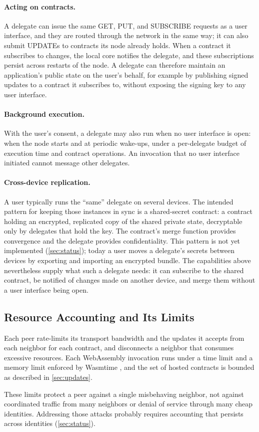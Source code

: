 \paragraph{Acting on contracts.} A delegate can issue the same \textsf{GET}, \textsf{PUT}, and \textsf{SUBSCRIBE} requests as a user interface, and they are routed through the network in the same way; it can also submit \textsf{UPDATE}s to contracts its node already holds. When a contract it subscribes to changes, the local core notifies the delegate, and these subscriptions persist across restarts of the node. A delegate can therefore maintain an application's public state on the user's behalf, for example by publishing signed updates to a contract it subscribes to, without exposing the signing key to any user interface.

\paragraph{Background execution.} With the user's consent, a delegate may also run when no user interface is open: when the node starts and at periodic wake-ups, under a per-delegate budget of execution time and contract operations. An invocation that no user interface initiated cannot message other delegates.

\paragraph{Cross-device replication.} A user typically runs the ``same'' delegate on several devices. The intended pattern for keeping those instances in sync is a shared-secret contract: a contract holding an encrypted, replicated copy of the shared private state, decryptable only by delegates that hold the key. The contract's merge function provides convergence and the delegate provides confidentiality. This pattern is not yet implemented (\cref{sec:status}); today a user moves a delegate's secrets between devices by exporting and importing an encrypted bundle. The capabilities above nevertheless supply what such a delegate needs: it can subscribe to the shared contract, be notified of changes made on another device, and merge them without a user interface being open.

\subsection{Resource Accounting and Its Limits}

Each peer rate-limits its transport bandwidth and the updates it accepts from each neighbor for each contract, and disconnects a neighbor that consumes excessive resources. Each WebAssembly invocation runs under a time limit and a memory limit enforced by Wasmtime \citep{wasmtime}, and the set of hosted contracts is bounded as described in \cref{sec:updates}.

These limits protect a peer against a single misbehaving neighbor, not against coordinated traffic from many neighbors or denial of service through many cheap identities. Addressing those attacks probably requires accounting that persists across identities (\cref{sec:status}).
